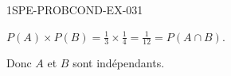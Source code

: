\begin{corrige}{1SPE-PROBCOND-EX-031}

$P(A) \times P(B) = \frac{1}{3} \times \frac{1}{4} = \frac{1}{12} = P(A \cap B)$.

Donc $A$ et $B$ sont indépendants.

\end{corrige}
